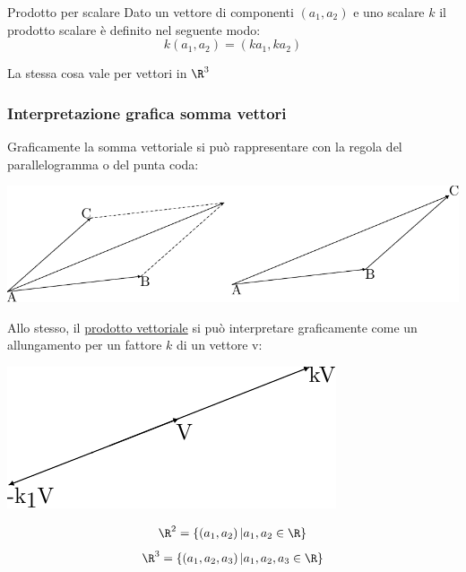\begin{definizione}{Prodotto per scalare}
	Dato un vettore di componenti $\left( a_1, a_2 \right)$ e uno scalare $k$ il prodotto scalare è definito nel seguente modo:
	\[
		k\left( a_1,a_2 \right) = \left( ka_1, ka_2 \right)
	\]
\end{definizione}

La stessa cosa vale per vettori in $\R^{3}$

\subsubsection*{Interpretazione grafica somma vettori}
Graficamente la somma vettoriale si può rappresentare con la regola del parallelogramma o del punta coda:

\begin{center}
	\includegraphics{Images/Somma vettori.pdf}
\end{center}

Allo stesso, il \underline{prodotto vettoriale} si può interpretare graficamente come un allungamento per un fattore $k$ di un vettore v:

\begin{center}
	\includegraphics{Images/Prodotto per scalare.pdf}
\end{center}

\[
	\R^2 = \left\{ \left( a_1, a_2 \right) | a_1,a_{2}  \in \R \right\}
\]
\[
	\R^{3} = \left\{ \left( a_1,a_2,a_3 \right) | a_1,a_2,a_3  \in \R \right\}
\]

\begin{center}
\end{center}

